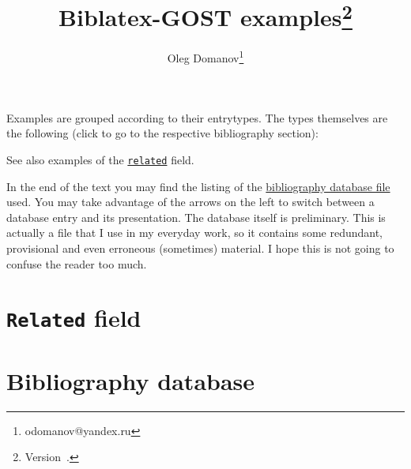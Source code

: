 \documentclass[a4paper,10pt]{article}
\title{Biblatex-GOST examples\thanks{Version~\bbx@gost@version.}}
\author{Oleg Domanov\thanks{odomanov@yandex.ru}}
\edef\mytempforAtCharacter{\char64}
\def\getkey#1#2{%
  \csappto{mytempforbibkey}{#1}%
  \ifstrequal{#2}{,}
  {\hspace{-4em}\makebox[4em]{\hyperlink{back:\mytempforbibkey}{$\Uparrow$}}%
   \raisebox{\baselineskip}{\hypertarget{\mytempforbibkey}{}}%
   \mytempforAtCharacter\mytempforbibtype\{\mytempforbibkey,}
  {\getkey#2}%
}
\renewcommand*{\do}[1]{\csdef{#1}##1{\def\mytempforbibtype{#1}\def\mytempforbibkey{}\getkey}}
\renewcommand*{\do}[1]{\csdef{#1}##1{\mytempforAtCharacter #1\{}}
\begin{document}
\maketitle
Examples are grouped according to their entrytypes. The types themselves are the following
(click to go to the respective bibliography section):
\renewcommand*{\do}[1]{\hyperref[#1]{@#1}\\}
\begin{multicols}{5}
\noindent%
\end{multicols}

See also examples of the \hyperref[related]{\texttt{related}} field.

In the end of the text you may find the listing of the
\hyperref[bibfile]{bibliography database file} used.
You may take advantage of
the arrows on the left to switch between a database entry and its presentation.
The database itself is preliminary. This is actually a file that I use in my everyday work,
so it contains some redundant, provisional and even erroneous (sometimes) material.
I hope this is not going to confuse the reader too much.

\nocite{*}

\renewcommand*{\do}[1]{\section{@#1\label{#1}}\printbibliography[type=#1]}

  {\hspace{-4em}}%

\section{\texttt{Related} field\label{related}}
\printbibliography[check=related]

\section{Bibliography database\label{bibfile}}
\end{document}
